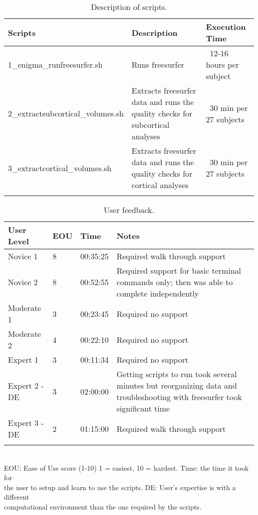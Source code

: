 \documentclass[twocolumn]{bmcart}%
\begin{document}

\begin{table*}
\caption {Description of scripts.} \label{tab:scripts}
  \begin{tabular}{p{4cm}p{6cm}p{4cm}}
    Scripts  & Description  &  Execution Time \\
      \hline\noalign{\smallskip}
      1\_enigma\_runfreesurfer.sh     &    Runs freesurfer      &    ~12-16 hours per subject    \\
      2\_extractsubcortical\_volumes.sh     &    Extracts freesurfer data and runs the quality checks for subcortical analyses      &    ~30 min per 27 subjects   \\
      3\_extractcortical\_volumes.sh     &    Extracts freesurfer data and runs the quality checks for cortical analyses     &     ~30 min per 27 subjects   \\
      \noalign{\smallskip}\hline
\end{tabular}
\end{table*}

\begin{table*}
	\caption {User feedback.} \label{tab:feedback}
\begin{tabular}{p{2cm}p{.5cm}p{1cm}p{6cm}}
  User Level  & EOU & Time & Notes \\
    \hline\noalign{\smallskip}
  Novice 1     &     8     &     00:35:25     &     Required walk through support   \\
  Novice 2     &     8     &     00:52:55     &     Required support for basic terminal commands only; then was able to complete independently   \\
  Moderate 1     &     3     &     00:23:45     &     Required no support   \\
  Moderate 2     &     4     &     00:22:10     &     Required no support   \\
  Expert 1     &     3     &     00:11:34     &     Required no support   \\
  Expert 2 - DE    &     3     &     02:00:00     &     Getting scripts to run took several minutes but reorganizing data and troubleshooting with freesurfer took significant time   \\ 
  Expert 3 - DE     &     2     &     01:15:00     &     Required walk through support   \\ 
  \noalign{\smallskip}\hline
\end{tabular}\\
EOU: Ease of Use score (1-10) 1 = easiest, 10 = hardest. Time: the time it took for\\
the user to setup and learn to use the scripts. DE: User's expertise is with a
different\\ computational environment than the one required by the scripts.

\end{table*}
\end{document}
